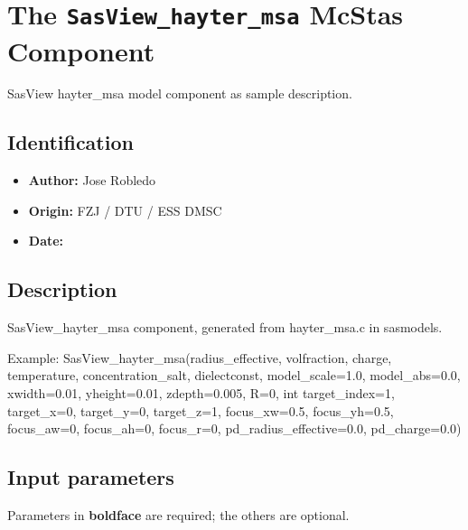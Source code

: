 \section{The \texttt{SasView\_hayter\_msa} McStas Component}
SasView hayter\_msa model component as sample description.

\subsection*{Identification}
\begin{itemize}
  \item \textbf{Author:} Jose Robledo
  \item \textbf{Origin:} FZJ / DTU / ESS DMSC
  \item \textbf{Date:} 
\end{itemize}

\subsection*{Description}
SasView\_hayter\_msa component, generated from hayter\_msa.c in sasmodels.

Example: SasView\_hayter\_msa(radius\_effective, volfraction, charge, temperature, concentration\_salt, dielectconst, model\_scale=1.0, model\_abs=0.0, xwidth=0.01, yheight=0.01, zdepth=0.005, R=0, int target\_index=1, target\_x=0, target\_y=0, target\_z=1, focus\_xw=0.5, focus\_yh=0.5, focus\_aw=0, focus\_ah=0, focus\_r=0, pd\_radius\_effective=0.0, pd\_charge=0.0)

\subsection*{Input parameters}
Parameters in \textbf{boldface} are required; the others are optional.

